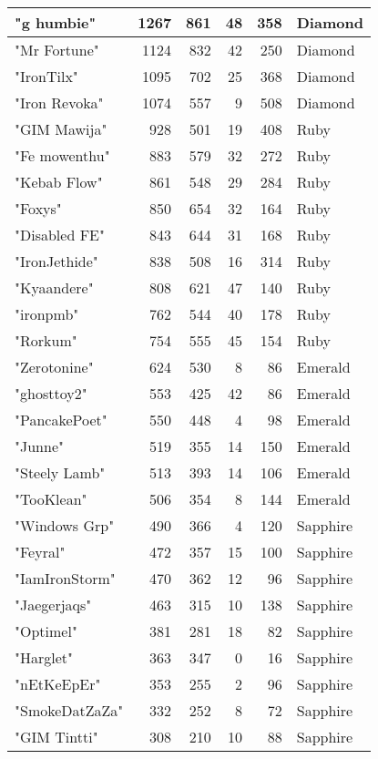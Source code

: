 \documentclass{article}
\begin{document}
\begin{table}[htbp]
\begin{tabular}{|l|r|r|r|r|l|}
"g humbie" & 1267 & 861 & 48 & 358 & Diamond \\ \hline
"Mr Fortune" & 1124 & 832 & 42 & 250 & Diamond \\ \hline
"IronTilx" & 1095 & 702 & 25 & 368 & Diamond \\ \hline
"Iron Revoka" & 1074 & 557 & 9 & 508 & Diamond \\ \hline
"GIM Mawija" & 928 & 501 & 19 & 408 & Ruby \\ \hline
"Fe mowenthu" & 883 & 579 & 32 & 272 & Ruby \\ \hline
"Kebab Flow" & 861 & 548 & 29 & 284 & Ruby \\ \hline
"Foxys" & 850 & 654 & 32 & 164 & Ruby \\ \hline
"Disabled FE" & 843 & 644 & 31 & 168 & Ruby \\ \hline
"IronJethide" & 838 & 508 & 16 & 314 & Ruby \\ \hline
"Kyaandere" & 808 & 621 & 47 & 140 & Ruby \\ \hline
"ironpmb" & 762 & 544 & 40 & 178 & Ruby \\ \hline
"Rorkum" & 754 & 555 & 45 & 154 & Ruby \\ \hline
"Zerotonine" & 624 & 530 & 8 & 86 & Emerald \\ \hline
"ghosttoy2" & 553 & 425 & 42 & 86 & Emerald \\ \hline
"PancakePoet" & 550 & 448 & 4 & 98 & Emerald \\ \hline
"Junne" & 519 & 355 & 14 & 150 & Emerald \\ \hline
"Steely Lamb" & 513 & 393 & 14 & 106 & Emerald \\ \hline
"TooKlean" & 506 & 354 & 8 & 144 & Emerald \\ \hline
"Windows Grp" & 490 & 366 & 4 & 120 & Sapphire \\ \hline
"Feyral" & 472 & 357 & 15 & 100 & Sapphire \\ \hline
"IamIronStorm" & 470 & 362 & 12 & 96 & Sapphire \\ \hline
"Jaegerjaqs" & 463 & 315 & 10 & 138 & Sapphire \\ \hline
"Optimel" & 381 & 281 & 18 & 82 & Sapphire \\ \hline
"Harglet" & 363 & 347 & 0 & 16 & Sapphire \\ \hline
"nEtKeEpEr" & 353 & 255 & 2 & 96 & Sapphire \\ \hline
"SmokeDatZaZa" & 332 & 252 & 8 & 72 & Sapphire \\ \hline
"GIM Tintti" & 308 & 210 & 10 & 88 & Sapphire \\ \hline

\end{tabular}
\end{table}
\end{document}
